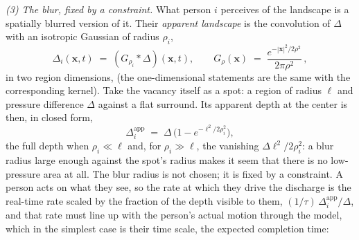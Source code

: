 \documentclass{article}
\begin{document}
\emph{(3) The blur, fixed by a constraint.} What person $i$ perceives of the landscape is a spatially blurred version of it. Their \emph{apparent landscape} is the convolution of $\Delta$ with an isotropic Gaussian of radius $\rho_i$,
\begin{equation}\label{eq:heatblur}
  \Delta_i(\mathbf{x},t) \;=\; (G_{\rho_i} \ast \Delta)(\mathbf{x},t), \qquad G_\rho(\mathbf{x}) \;=\; \frac{e^{-|\mathbf{x}|^2/2\rho^2}}{2\pi\rho^2}\,,
\end{equation}
in two region dimensions, (the one-dimensional statements are the same with the corresponding kernel). Take the vacancy itself as a spot: a region of radius $\ell$ and pressure difference $\Delta$ against a flat surround. Its apparent depth at the center is then, in closed form,
\begin{equation}\label{eq:apparent-depth}
  \Delta^{\mathrm{app}}_i \;=\; \Delta\,\bigl(1 - e^{-\ell^2/2\rho_i^2}\bigr),
\end{equation}
the full depth when $\rho_i \ll \ell$ and, for $\rho_i \gg \ell$, the vanishing $\Delta \ell^2/2\rho_i^2$: a blur radius large enough against the spot's radius makes it seem that there is no low-pressure area at all. The blur radius is not chosen; it is fixed by a constraint. A person acts on what they see, so the rate at which they drive the discharge is the real-time rate scaled by the fraction of the depth visible to them, $(1/\tau)\,\Delta^{\mathrm{app}}_i/\Delta$, and that rate must line up with the person's actual motion through the model, which in the simplest case is their time scale, the expected completion time:
\end{document}
